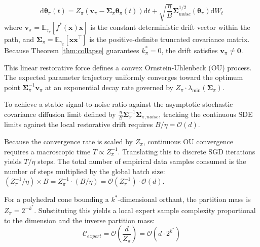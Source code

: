 \documentclass{article}
\newcommand{\E}{\mathbb{E}}
\newcommand{\1}{\mathbb{I}}
\newcommand{\diff}{\mathrm{d}}
\newcommand{\calO}{\mathcal{O}}
\newcommand{\bx}{\mathbf{x}}
\newcommand{\bv}{\mathbf{v}}
\newcommand{\btheta}{\boldsymbol{\theta}}
\newcommand{\bSigma}{\boldsymbol{\Sigma}}
\begin{document}
\begin{equation} \label{eq:sde}
    \diff\btheta_\pi(t) = Z_\pi \left( \bv_\pi - \bSigma_\pi \btheta_\pi(t) \right) \diff t + \sqrt{\frac{\eta}{B}} \bSigma_{noise}^{1/2}(\btheta_\pi) \diff W_t
\end{equation}
where $\bv_\pi = \E_{\gamma_\pi}[f^*(\bx)\bx]$ is the constant deterministic drift vector within the path, and $\bSigma_\pi = \E_{\gamma_\pi}[\bx\bx^\top]$ is the positive-definite truncated covariance matrix. Because Theorem \ref{thm:collapse} guarantees $k_\pi^* = 0$, the drift satisfies $\bv_\pi \neq \mathbf{0}$. 

This linear restorative force defines a convex Ornstein-Uhlenbeck (OU) process. The expected parameter trajectory uniformly converges toward the optimum point $\bSigma_\pi^{-1} \bv_\pi$ at an exponential decay rate governed by $Z_\pi \cdot \lambda_{\min}(\bSigma_\pi)$.

To achieve a stable signal-to-noise ratio against the asymptotic stochastic covariance diffusion limit defined by $\frac{\eta}{B} \bSigma_\pi^{-1} \bSigma_{\pi, noise}$, tracking the continuous SDE limits against the local restorative drift requires $B/\eta = \calO(d)$. 

Because the convergence rate is scaled by $Z_\pi$, continuous OU convergence requires a macroscopic time $T \propto Z_\pi^{-1}$. Translating this to discrete SGD iterations yields $T/\eta$ steps. The total number of empirical data samples consumed is the number of steps multiplied by the global batch size: $(Z_\pi^{-1}/\eta) \times B = Z_\pi^{-1} \cdot (B/\eta) = \calO(Z_\pi^{-1}) \cdot \calO(d)$. 

For a polyhedral cone bounding a $k^*$-dimensional orthant, the partition mass is $Z_\pi = 2^{-k^*}$. Substituting this yields a local expert sample complexity proportional to the dimension and the inverse partition mass:
\begin{equation}
    \mathcal{C}_{expert} = \calO\left(\frac{d}{Z_\pi}\right) = \calO(d \cdot 2^{k^*})
\end{equation}
\end{document}
